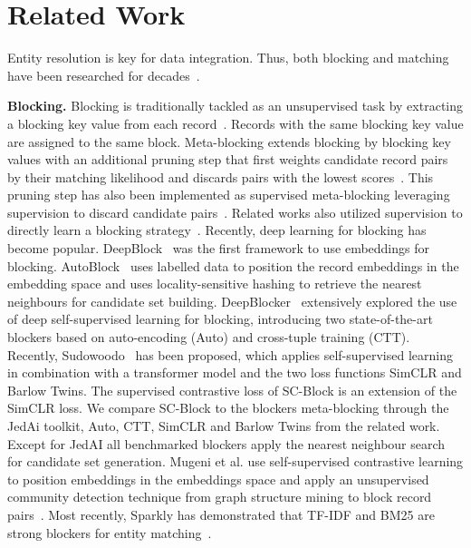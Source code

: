 \documentclass[sigconf,nonacm]{acmart}
\begin{document}
 \section{Related Work}
\label{sec:related_work}



Entity resolution is key for data integration. Thus, both blocking and matching have been researched for decades~\cite{christen_data_2012, cohen_learning_2002, konda_magellan_2016, papadakis_blocking_2021}.

\vspace{.05cm}\noindent\textbf{Blocking.}
Blocking is traditionally tackled as an unsupervised task by extracting a blocking key value from each record~\cite{christen_survey_2012, aizawa_fast_2005}. Records with the same blocking key value are assigned to the same block. Meta-blocking extends blocking by blocking key values with an additional pruning step that first weights candidate record pairs by their matching likelihood and discards pairs with the lowest scores~\cite{efthymiou_parallel_2017}. This pruning step has also been implemented as supervised meta-blocking leveraging supervision to discard candidate pairs~\cite{gagliardelli_generalized_2022,papadakis_supervised_2014}.
Related works also utilized supervision to directly learn a blocking strategy~\cite{bilenko_adaptive_2006, zhang_autoblock_2020}.
Recently, deep learning for blocking has become popular. DeepBlock~\cite{javdani_deepblock_2019} was the first framework to use embeddings for blocking. 
AutoBlock~\cite{zhang_autoblock_2020} uses labelled data to position the record embeddings in the embedding space and uses locality-sensitive hashing to retrieve the nearest neighbours for candidate set building. 
DeepBlocker~\cite{thirumuruganathan_deep_2021} extensively explored the use of deep self-supervised learning for blocking, introducing two state-of-the-art blockers based on auto-encoding (Auto) and cross-tuple training (CTT).
Recently, Sudowoodo~\cite{wang_sudowoodo_2022} has been proposed, which applies self-supervised learning in combination with a transformer model and the two loss functions SimCLR and Barlow Twins.
The supervised contrastive loss of SC-Block is an extension of the SimCLR loss.
We compare SC-Block to the blockers meta-blocking through the JedAi toolkit, Auto, CTT, SimCLR and Barlow Twins from the related work.
Except for JedAI all benchmarked blockers apply the nearest neighbour search for candidate set generation.
Mugeni et al. use self-supervised contrastive learning to position embeddings in the embeddings space and apply an unsupervised community detection technique from graph structure mining to block record pairs~\cite{mugeni_graph-based_2022}.
Most recently, Sparkly has demonstrated that TF-IDF and BM25 are strong blockers for entity matching~\cite{paulsen_sparkly_2023}.
\end{document}
